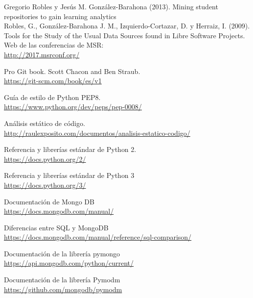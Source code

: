 
\cleardoublepage

\begin{thebibliography}{25}


 Gregorio Robles y Jesús M. González-Barahona (2013). Mining student repositories to gain learning analytics\\

 Robles, G., González-Barahona J. M., Izquierdo-Cortazar, D. y Herraiz, I. (2009). Tools for the Study of the Usual Data Sources found in Libre Software Projects.\\

 Web de las conferencias de MSR:   \\
{\footnotesize
\url{http://2017.msrconf.org/}} 

Pro Git book. Scott Chacon and Ben Straub.   \\
{\footnotesize
\url{https://git-scm.com/book/es/v1}} 

 Guía de estilo de Python PEP8.   \\
{\footnotesize
\url{https://www.python.org/dev/peps/pep-0008/}} 

Análisis estático de código.   \\
{\footnotesize
\url{http://raulexposito.com/documentos/analisis-estatico-codigo/}} 

Referencia y librerías estándar de Python 2.   \\
{\footnotesize
\url{https://docs.python.org/2/}} 

Referencia y librerías estándar de Python 3   \\
{\footnotesize
\url{https://docs.python.org/3/}} 

Documentación de Mongo DB   \\
{\footnotesize
\url{https://docs.mongodb.com/manual/}} 

Diferencias entre SQL y MongoDB   \\
{\footnotesize
\url{https://docs.mongodb.com/manual/reference/sql-comparison/}} 

Documentación de la librería pymongo   \\
{\footnotesize
\url{https://api.mongodb.com/python/current/}} 

Documentación de la librería Pymodm   \\
{\footnotesize
\url{https://github.com/mongodb/pymodm}} 


\end{thebibliography}
